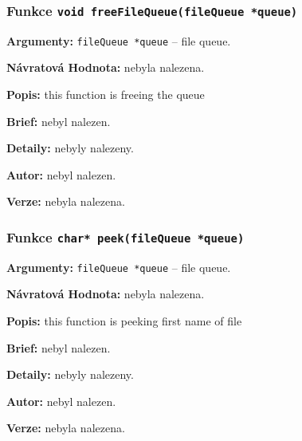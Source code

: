 \documentclass[12pt, a4paper]{article}
\begin{document}
\subsubsection{Funkce \texttt{void freeFileQueue(fileQueue *queue)}}
\textbf{Argumenty: }\verb"fileQueue *queue" -- file queue. \\
\par\noindent
\textbf{Návratová Hodnota: }nebyla nalezena.\\
\par\noindent
\textbf{Popis: }this function is freeing the queue\\
\par\noindent
\textbf{Brief: }nebyl nalezen.\\
\par\noindent
\textbf{Detaily: }nebyly nalezeny.\\
\par\noindent
\textbf{Autor: }nebyl nalezen.\\
\par\noindent
\textbf{Verze: }nebyla nalezena.\\
\par\noindent
\subsubsection{Funkce \texttt{char* peek(fileQueue *queue)}}
\textbf{Argumenty: }\verb"fileQueue *queue" -- file queue. \\
\par\noindent
\textbf{Návratová Hodnota: }nebyla nalezena.\\
\par\noindent
\textbf{Popis: }this function is peeking first name of file\\
\par\noindent
\textbf{Brief: }nebyl nalezen.\\
\par\noindent
\textbf{Detaily: }nebyly nalezeny.\\
\par\noindent
\textbf{Autor: }nebyl nalezen.\\
\par\noindent
\textbf{Verze: }nebyla nalezena.\\
\par\noindent
\end{document}
